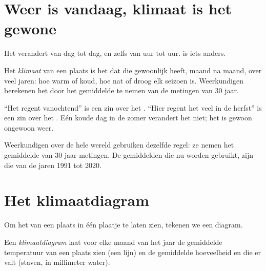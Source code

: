 \section{Weer is vandaag, klimaat is het gewone}

Het  verandert van dag tot dag, en zelfs van uur tot uur.  is
iets anders.

\begin{definition}[Klimaat]\label{def:g5:weather-and-climate:climate}
Het \emph{klimaat} van een plaats is het  dat die
gewoonlijk heeft, maand na maand, over veel jaren: hoe warm of koud, hoe
nat of droog elk seizoen is. Weerkundigen berekenen het door het gemiddelde
te nemen van de metingen van 30 jaar.
\end{definition}

``Het regent vanochtend'' is een zin over het . ``Hier regent het veel
in de herfst'' is een zin over het . Eén koude dag in de zomer
verandert het  niet; het is gewoon ongewoon weer.

Weerkundigen over de hele wereld gebruiken dezelfde regel: ze nemen het
gemiddelde van 30 jaar metingen. De gemiddelden die nu worden gebruikt,
zijn die van de jaren 1991 tot 2020.

\section{Het klimaatdiagram}

Om het  van een plaats in één plaatje te laten zien, tekenen we een
diagram.

\begin{definition}[Klimaatdiagram]\label{def:g5:weather-and-climate:climate-chart}
Een \emph{klimaatdiagram} laat voor elke maand van het
jaar de gemiddelde temperatuur van een plaats zien (een lijn) en de
gemiddelde hoeveelheid  en  die er valt (staven, in millimeter
water).
\end{definition}

